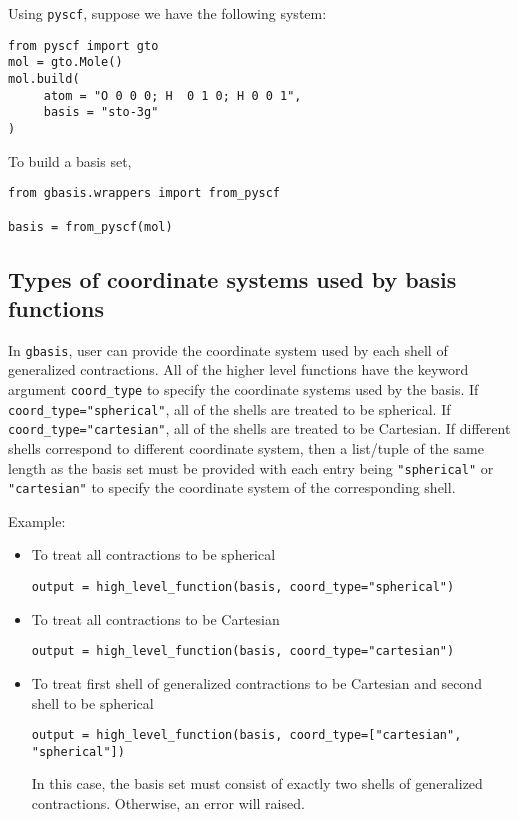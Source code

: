 \documentclass[letterpaper]{article}
\begin{document}
Using \verb|pyscf|, suppose we have the following system:
\begin{lstlisting}
from pyscf import gto
mol = gto.Mole()
mol.build(
     atom = "O 0 0 0; H  0 1 0; H 0 0 1",
     basis = "sto-3g"
)
\end{lstlisting}
To build a basis set,
\begin{lstlisting}
from gbasis.wrappers import from_pyscf

basis = from_pyscf(mol)
\end{lstlisting}

\subsection{Types of coordinate systems used by basis functions}
In \verb|gbasis|, user can provide the coordinate system used by each shell of
generalized contractions.
All of the higher level functions have the keyword argument \verb|coord_type| to
specify the coordinate systems used by the basis.
If \verb|coord_type="spherical"|, all of the shells are treated to be spherical.
If \verb|coord_type="cartesian"|, all of the shells are treated to be
Cartesian.
If different shells correspond to different coordinate system, then a list/tuple
of the same length as the basis set must be provided with each entry being
\verb|"spherical"| or \verb|"cartesian"| to specify the coordinate system of the
corresponding shell.

Example:
\begin{itemize}
\item To treat all contractions to be spherical
  \begin{lstlisting}[xleftmargin=-25pt]
output = high_level_function(basis, coord_type="spherical")
\end{lstlisting}
\item To treat all contractions to be Cartesian
  \begin{lstlisting}[xleftmargin=-25pt]
output = high_level_function(basis, coord_type="cartesian")
\end{lstlisting}
\item To treat first shell of generalized contractions to be Cartesian and
  second shell to be spherical
  \begin{lstlisting}[xleftmargin=-25pt]
output = high_level_function(basis, coord_type=["cartesian", "spherical"])
\end{lstlisting}
  In this case, the basis set must consist of exactly two shells of
  generalized contractions. Otherwise, an error will raised.
\end{itemize}
\end{document}
